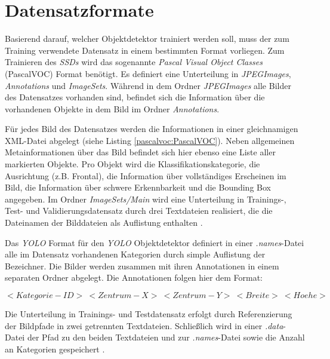 \section{Datensatzformate} \label{format}

Basierend darauf, welcher Objektdetektor trainiert werden soll, muss der zum Training verwendete Datensatz in einem bestimmten Format vorliegen. Zum Trainieren des \textit{SSDs} wird das sogenannte \textit{Pascal Visual Object Classes} (PascalVOC) Format benötigt. Es definiert eine Unterteilung in \textit{JPEGImages}, \textit{Annotations} und \textit{ImageSets}. Während in dem Ordner \textit{JPEGImages} alle Bilder des Datensatzes vorhanden sind, befindet sich die Information über die vorhandenen Objekte in dem Bild im Ordner \textit{Annotations}.

\lstset{language=XML}


Für jedes Bild des Datensatzes werden die Informationen in einer gleichnamigen XML-Datei abgelegt (siehe Listing \ref{pascalvoc:PascalVOC}). Neben allgemeinen Metainformationen über das Bild befindet sich hier ebenso eine Liste aller markierten Objekte. Pro Objekt wird die Klassifikationskategorie, die Ausrichtung (z.B. \glqq Frontal\grqq{}), die Information über vollständiges Erscheinen im Bild, die Information über schwere Erkennbarkeit und die Bounding Box angegeben. Im Ordner \textit{ImageSets/Main} wird eine Unterteilung in Trainings-, Test- und Validierungsdatensatz durch drei Textdateien realisiert, die die Dateinamen der Bilddateien als Auflistung enthalten \cite{MarkEveringhamS.M.AliEslamiLucVanGoolChristopherK.I.WilliamsJohnWinnAndrewZis.2014,MarkEveringham.20120521,MarkEveringham.20120521}. 

Das \textit{YOLO} Format für den \textit{YOLO} Objektdetektor definiert in einer \textit{.names}-Datei alle im Datensatz vorhandenen Kategorien durch simple Auflistung der Bezeichner. Die Bilder werden zusammen mit ihren Annotationen in einem separaten Ordner abgelegt. Die Annotationen folgen hier dem Format:

$<Kategorie-ID>\:<Zentrum-X>\:<Zentrum-Y>\:<Breite>\:<Hoehe>$

Die Unterteilung in Trainings- und Testdatensatz erfolgt durch Referenzierung der Bildpfade in zwei getrennten Textdateien. Schließlich wird in einer \textit{.data}-Datei der Pfad zu den beiden Textdateien und zur \textit{.names}-Datei sowie die Anzahl an Kategorien gespeichert \cite{ArunPonnusamy.20191006}.